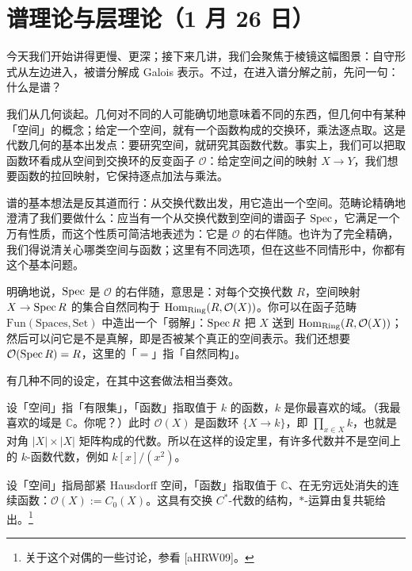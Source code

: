 \section[谱理论与层理论]{谱理论与层理论（1 月 26 日）}

今天我们开始讲得更慢、更深；接下来几讲，我们会聚焦于棱镜这幅图景：自守形式从左边进入，被谱分解成 Galois 表示。不过，在进入谱分解之前，先问一句：什么是谱？

我们从几何谈起。几何对不同的人可能确切地意味着不同的东西，但几何中有某种「空间」的概念；给定一个空间，就有一个函数构成的交换环，乘法逐点取。这是代数几何的基本出发点：要研究空间，就研究其函数代数。事实上，我们可以把取函数环看成从空间到交换环的反变函子 $\mathcal{O}$：给定空间之间的映射 $X\to Y$，我们想要函数的拉回映射，它保持逐点加法与乘法。

谱的基本想法是反其道而行：从交换代数出发，用它造出一个空间。范畴论精确地澄清了我们要做什么：应当有一个从交换代数到空间的谱函子 $\operatorname{Spec}$，它满足一个万有性质，而这个性质可简洁地表述为：它是 $\mathcal{O}$ 的右伴随。也许为了完全精确，我们得说清关心哪类空间与函数；这里有不同选项，但在这些不同情形中，你都有这个基本问题。

明确地说，$\operatorname{Spec}$ 是 $\mathcal{O}$ 的右伴随，意思是：对每个交换代数 $R$，空间映射 $X\to\operatorname{Spec} R$ 的集合自然同构于 $\operatorname{Hom}_{\mathrm{Ring}}(R,\mathcal{O}(X))$。你可以在函子范畴 $\mathrm{Fun}(\mathrm{Spaces},\mathrm{Set})$ 中造出一个「弱解」：$\operatorname{Spec} R$ 把 $X$ 送到 $\operatorname{Hom}_{\mathrm{Ring}}(R,\mathcal{O}(X))$；然后可以问它是不是真解，即是否被某个真正的空间表示。我们还想要 $\mathcal{O}(\operatorname{Spec} R)=R$，这里的「$=$」指「自然同构」。

有几种不同的设定，在其中这套做法相当奏效。


\begin{example}
设「空间」指「有限集」，「函数」指取值于 $k$ 的函数，$k$ 是你最喜欢的域。（我最喜欢的域是 $\mathbb{C}$。你呢？）此时 $\mathcal{O}(X)$ 是函数环 $\{X\to k\}$，即 $\prod_{x\in X}k$，也就是对角 $|X|\times|X|$ 矩阵构成的代数。所以在这样的设定里，有许多代数并不是空间上的 $k$-函数代数，例如 $k[x]/(x^2)$。
\end{example}

\begin{example}[Gelfand]
设「空间」指局部紧 Hausdorff 空间，「函数」指取值于 $\mathbb{C}$、在无穷远处消失的连续函数：$\mathcal{O}(X):=C_0(X)$。这具有交换 $C^*$-代数的结构，$*$-运算由复共轭给出。\footnote{关于这个对偶的一些讨论，参看 [aHRW09]。}
\end{example}

